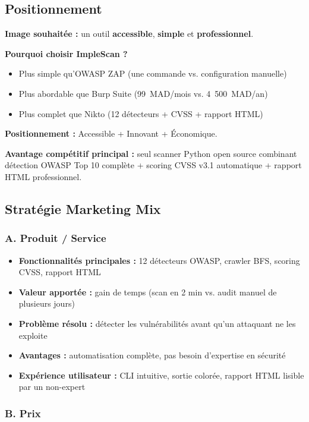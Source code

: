 \documentclass[12pt,a4paper]{report}
\begin{document}
\subsection{Positionnement}

\textbf{Image souhaitée :} un outil \textbf{accessible}, \textbf{simple} et \textbf{professionnel}.

\textbf{Pourquoi choisir ImpleScan ?}
\begin{itemize}
  \item Plus simple qu'OWASP ZAP (une commande vs. configuration manuelle)
  \item Plus abordable que Burp Suite (99~MAD/mois vs. 4~500~MAD/an)
  \item Plus complet que Nikto (12 détecteurs + CVSS + rapport HTML)
\end{itemize}

\textbf{Positionnement :} Accessible + Innovant + Économique.

\textbf{Avantage compétitif principal :} seul scanner Python open source combinant détection OWASP Top 10 complète + scoring CVSS v3.1 automatique + rapport HTML professionnel.

\subsection{Stratégie Marketing Mix}

\subsubsection{A. Produit / Service}

\begin{itemize}
  \item \textbf{Fonctionnalités principales :} 12 détecteurs OWASP, crawler BFS, scoring CVSS, rapport HTML
  \item \textbf{Valeur apportée :} gain de temps (scan en 2 min vs. audit manuel de plusieurs jours)
  \item \textbf{Problème résolu :} détecter les vulnérabilités avant qu'un attaquant ne les exploite
  \item \textbf{Avantages :} automatisation complète, pas besoin d'expertise en sécurité
  \item \textbf{Expérience utilisateur :} CLI intuitive, sortie colorée, rapport HTML lisible par un non-expert
\end{itemize}

\subsubsection{B. Prix}
\end{document}
